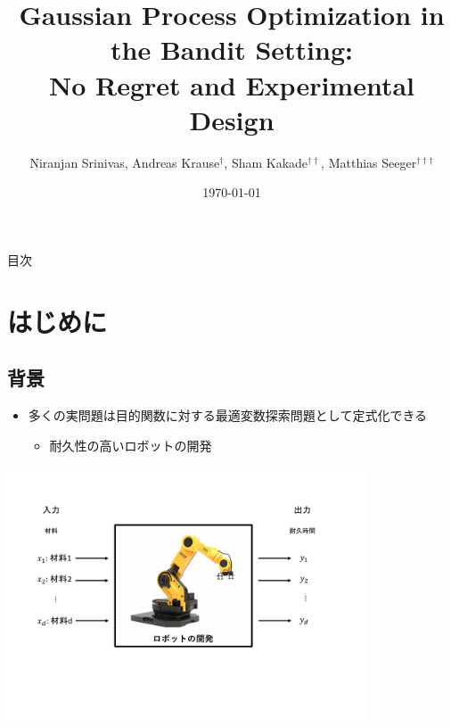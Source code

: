 \documentclass[dvipdfmx, 10.5pt]{beamer}
\title[]{Gaussian Process Optimization in the Bandit Setting:\\No Regret and Experimental Design}
\subtitle{}
\author[]{Niranjan Srinivas, Andreas Krause$^{\dag}$, Sham Kakade$^{\dag\dag}$, Matthias Seeger$^{\dag\dag\dag}$}
\date[\today]{\today}
\institute[]{$\dag$: California Institute of Technology\\
$\dag\dag$: University of Pennsylvania\\
$\dag\dag\dag$: Saarland University}
\begin{document}

\begin{frame}
\maketitle%
\thispagestyle{empty}%
\end{frame}



\begin{frame}[noframenumbering]{目次}
	\tableofcontents[hideallsubsections]
	\thispagestyle{empty} %
\end{frame}

\section{はじめに}

\subsection{背景}
\begin{frame}{\insertsubsection}
	\begin{itemize}
		\item 多くの実問題は目的関数に対する最適変数探索問題として定式化できる
		\begin{itemize}
			\item 耐久性の高いロボットの開発
		\end{itemize}
	\end{itemize}
	\begin{center}
		\includegraphics[width=0.80\textwidth]{./Fig/Robot.pdf}
	\end{center}
\end{frame}
\end{document}
